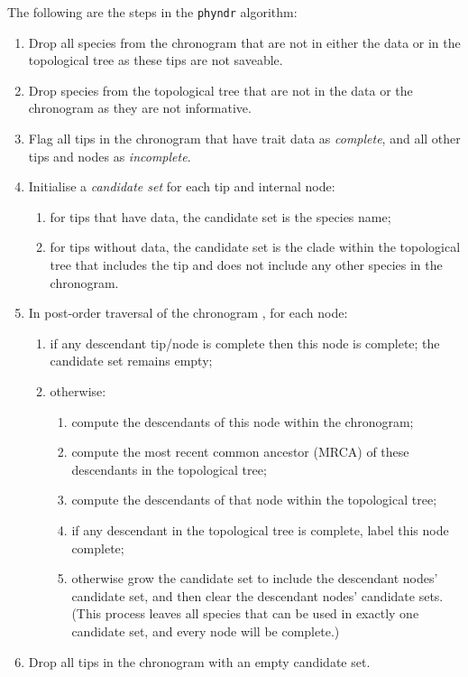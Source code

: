 \documentclass[a4paper,11pt]{article}
\newcommand{\phyndr}{\tt phyndr}
\begin{document}
The following are the steps in the {\phyndr} algorithm:

\begin{enumerate}
\item Drop all species from the chronogram that are not in either the data or in the topological tree as these tips are not saveable.
\item Drop species from the topological tree that are not in the data or the chronogram as they are not informative.
\item Flag all tips in the chronogram that have trait data as \emph{complete}, and all other tips and nodes as \emph{incomplete}.
\item Initialise a \emph{candidate set} for each tip and internal node:
  \begin{enumerate}
  \item for tips that have data, the candidate set is the species name;
  \item for tips without data, the candidate set is the clade within the topological tree that includes the tip and does not include any other species in the chronogram.
  \end{enumerate}
\item In post-order traversal of the chronogram \citep{Felsenstein1973}, for each node:
\begin{enumerate}
  \item if any descendant tip/node is complete then this node is complete; the candidate set remains empty;
  \item otherwise:
\begin{enumerate}
    \item compute the descendants of this node within the chronogram;
    \item compute the most recent common ancestor (MRCA) of these descendants in the topological tree;
    \item compute the descendants of that node within the topological tree;
    \item if any descendant in the topological tree is complete, label this node complete;
    \item otherwise grow the candidate set to include the descendant nodes' candidate set, and then clear the descendant nodes' candidate sets.  (This process leaves all species that can be used in exactly one candidate set, and every node will be complete.)
\end{enumerate}
\end{enumerate}
\item Drop all tips in the chronogram with an empty candidate set.
\end{enumerate}
\end{document}
